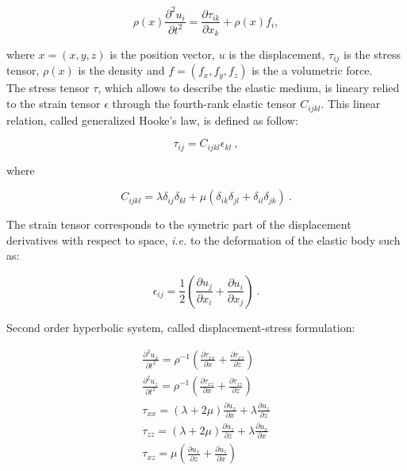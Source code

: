 \documentclass{gnulike}
\begin{document}
\begin{equation}
  \label{eq:motion}
  \rho(x) \frac{\partial^{2}u_{i}}{\partial t^{2}} = \frac{\partial \tau_{ik}}{\partial x_{k}} + \rho(x)f_{i} ,
\end{equation}

\noindent where $x=(x,y,z)$ is the position vector, $u$ is the displacement, $\tau_{ij}$ is the stress tensor, $\rho(x)$ is the density and $f=(f_{x}, f_{y}, f_{z})$ is the a volumetric force.\\

\noindent The stress tensor $\tau$, which allows to describe the elastic medium, is lineary relied to the strain tensor $\epsilon$ through the fourth-rank elastic tensor $C_{ijkl}$. This linear relation, called generalized Hooke's law,  is defined as follow:

\begin{equation}
  \label{eq:hooke}
  \tau_{ij} = C_{ijkl}\epsilon_{kl}\ ,
\end{equation} 

\noindent where

\begin{equation}
  \label{eq:elastic-tensor}
  C_{ijkl} = \lambda \delta_{ij} \delta_{kl} + \mu (\delta_{ik}\delta_{jl}+\delta_{il}\delta_{jk})\ .
\end{equation}

\noindent The strain tensor corresponds to the symetric part of the displacement derivatives with respect to space, \textit{i.e.} to the deformation of the elastic body such as:

\begin{equation}
  \label{eq:strain-tensor}
  \epsilon_{ij} = \frac{1}{2} \left( \frac{\partial u_{j}}{\partial x_{i}} + \frac{\partial u_{i}}{\partial x_{j}} \right)\ .
\end{equation}

\noindent Second order hyperbolic system, called displacement-stress formulation:

\begin{eqnarray}
  \label{eq:displacement-stress}
  \frac{\partial ^{2} u_{x}}{\partial t^{2}} = \rho^{{\scriptscriptstyle-1}} \left( \frac{\partial \tau_{xx}}{\partial x} + \frac{\partial \tau_{xz}}{\partial z} \right) \nonumber \\
  \frac{\partial ^{2} u_{z}}{\partial t^{2}} = \rho^{{\scriptscriptstyle -1}} \left( \frac{\partial \tau_{xz}}{\partial x} + \frac{\partial \tau_{zz}}{\partial z} \right) \nonumber \\
  \tau_{xx} = (\lambda+2\mu)\frac{\partial u_{x}}{\partial x} + \lambda \frac{\partial u_{z}}{\partial z} \\
  \tau_{zz}= (\lambda+2\mu)\frac{\partial u_{z}}{\partial z} + \lambda \frac{\partial u_{x}}{\partial x} \nonumber \\
  \tau_{xz} = \mu \left( \frac{\partial u_{x}}{\partial z} + \frac{\partial u_{z}}{\partial x } \right) \nonumber
\end{eqnarray}\\
\end{document}
